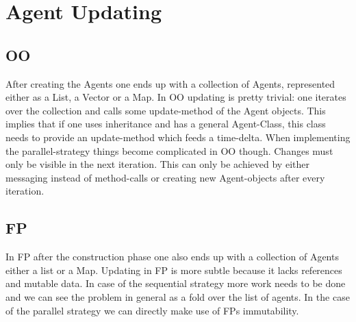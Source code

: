 \chapter{Agent Updating}

\section{OO}
After creating the Agents one ends up with a collection of Agents, represented either as a List, a Vector or a Map. In OO updating is pretty trivial: one iterates over the collection and calls some update-method of the Agent objects. This implies that if one uses inheritance and has a general Agent-Class, this class needs to provide an update-method which feeds a time-delta.
When implementing the parallel-strategy things become complicated in OO though. Changes must only be visible in the next iteration. This can only be achieved by either messaging instead of method-calls or creating new Agent-objects after every iteration.

\section{FP}
In FP after the construction phase one also ends up with a collection of Agents either a list or a Map. Updating in FP is more subtle because it lacks references and mutable data. In case of the sequential strategy more work needs to be done and we can see the problem in general as a fold over the list of agents. In the case of the parallel strategy we can directly make use of FPs immutability.